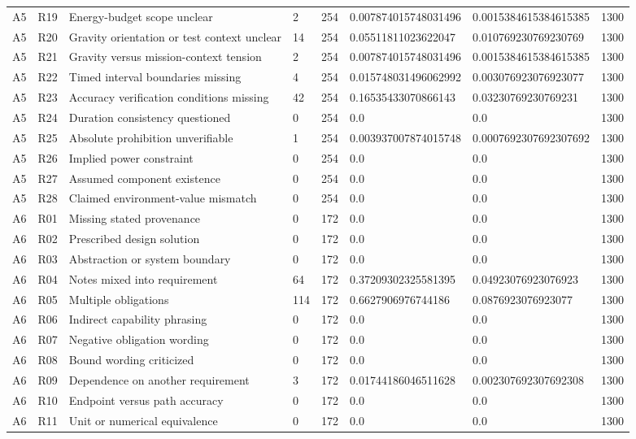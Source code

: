 \begin{tabular}{llllllll}
A5 & R19 & Energy-budget scope unclear & 2 & 254 & 0.007874015748031496 & 0.0015384615384615385 & 1300 \\
A5 & R20 & Gravity orientation or test context unclear & 14 & 254 & 0.05511811023622047 & 0.010769230769230769 & 1300 \\
A5 & R21 & Gravity versus mission-context tension & 2 & 254 & 0.007874015748031496 & 0.0015384615384615385 & 1300 \\
A5 & R22 & Timed interval boundaries missing & 4 & 254 & 0.015748031496062992 & 0.003076923076923077 & 1300 \\
A5 & R23 & Accuracy verification conditions missing & 42 & 254 & 0.16535433070866143 & 0.03230769230769231 & 1300 \\
A5 & R24 & Duration consistency questioned & 0 & 254 & 0.0 & 0.0 & 1300 \\
A5 & R25 & Absolute prohibition unverifiable & 1 & 254 & 0.003937007874015748 & 0.0007692307692307692 & 1300 \\
A5 & R26 & Implied power constraint & 0 & 254 & 0.0 & 0.0 & 1300 \\
A5 & R27 & Assumed component existence & 0 & 254 & 0.0 & 0.0 & 1300 \\
A5 & R28 & Claimed environment-value mismatch & 0 & 254 & 0.0 & 0.0 & 1300 \\
A6 & R01 & Missing stated provenance & 0 & 172 & 0.0 & 0.0 & 1300 \\
A6 & R02 & Prescribed design solution & 0 & 172 & 0.0 & 0.0 & 1300 \\
A6 & R03 & Abstraction or system boundary & 0 & 172 & 0.0 & 0.0 & 1300 \\
A6 & R04 & Notes mixed into requirement & 64 & 172 & 0.37209302325581395 & 0.04923076923076923 & 1300 \\
A6 & R05 & Multiple obligations & 114 & 172 & 0.6627906976744186 & 0.0876923076923077 & 1300 \\
A6 & R06 & Indirect capability phrasing & 0 & 172 & 0.0 & 0.0 & 1300 \\
A6 & R07 & Negative obligation wording & 0 & 172 & 0.0 & 0.0 & 1300 \\
A6 & R08 & Bound wording criticized & 0 & 172 & 0.0 & 0.0 & 1300 \\
A6 & R09 & Dependence on another requirement & 3 & 172 & 0.01744186046511628 & 0.002307692307692308 & 1300 \\
A6 & R10 & Endpoint versus path accuracy & 0 & 172 & 0.0 & 0.0 & 1300 \\
A6 & R11 & Unit or numerical equivalence & 0 & 172 & 0.0 & 0.0 & 1300 \\

\end{tabular}
